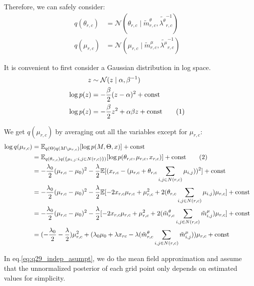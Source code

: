 \documentclass[12pt]{article}
\newcommand\numberthis{\addtocounter{equation}{1}\tag{\theequation}}
\newenvironment{problem}[2][Problem]{\begin{trivlist}
\item[\hskip \labelsep {\bfseries #1}\hskip \labelsep {\bfseries #2.}]}{\end{trivlist}}
\begin{document}
\begin{problem}{2.9.25}
Therefore, we can safely consider:
\begin{align*}
    q(\theta_{r,c}) &= \mathcal{N}(\theta_{r,c} 
                \mid \tilde{m}^{\theta}_{r,c}, \tilde{\lambda^{\theta}}^{-1}_{r,c}) \\
    q(\mu_{r,c}) &= \mathcal{N}(\mu_{r,c} 
                \mid \tilde{m}^{\mu}_{r,c}, \tilde{\lambda^{\mu}}^{-1}_{r,c})
\end{align*}

It is convenient to first consider a Gaussian distribution in log space.
\begin{align*}
    z &\sim \mathcal{N}(z\mid \alpha, \beta^{-1}) \\
    \log p(z) &= -\frac{\beta}{2}(z - \alpha)^2 +\text{const} \\
    \log p(z) &= -\frac{\beta}{2}z^2 + \alpha\beta z + \text{const} \numberthis \label{eq:logspaceNormal}
\end{align*}

We get $q(\mu_{r,c})$ by averaging out all the variables except for $\mu_{r,c}$:
\begin{align*}
    \log q(\mu_{r,c}) &= 
        \mathbb{E}_{q(\Theta)q(M\backslash\mu_{r,c})}[\log p(M, \Theta, x)] 
        + \text{const} \\
    &= \mathbb{E}_{q(\theta_{r,c})q(\{\mu_{i,j}: i, j \in N(r,c)\})}[\log p(\theta_{r,c}, \mu_{r,c}, x_{r,c})]
    + \text{const} \numberthis \label{eq:q29_indep_asumpt} \\
    &= -\frac{\lambda_0}{2}(\mu_{r,c} - \mu_0)^2
    -\frac{\lambda}{2}\mathbb{E}[(x_{r,c} - (\mu_{r,c} + \theta_{r,c}\sum_{i,j \in N(r,c)}\mu_{i,j}))^2] + \text{const} \\
    &= -\frac{\lambda_0}{2}(\mu_{r,c} - \mu_0)^2 
    -\frac{\lambda}{2}\mathbb{E}[-2x_{r,c}\mu_{r,c} + \mu_{r,c}^2 + 2(\theta_{r,c}\sum_{i,j \in N(r,c)}\mu_{i,j})\mu_{r,c}]
    + \text{const} \\
    &= -\frac{\lambda_0}{2}(\mu_{r,c} - \mu_0)^2 
    -\frac{\lambda}{2}[-2x_{r,c}\mu_{r,c} + \mu_{r,c}^2 + 2(\tilde{m}^{\theta}_{r,c}\sum_{i,j \in N(r,c)}\tilde{m}^{\mu}_{i,j})\mu_{r,c}]
    + \text{const} \\
    &= (-\frac{\lambda_0}{2} -\frac{\lambda}{2})\mu_{r,c}^2
    + (\lambda_0\mu_0 + \lambda x_{rc} -\lambda(\tilde{m}^{\theta}_{r,c}\sum_{i,j \in N(r,c)}\tilde{m}^{\mu}_{i,j}))\mu_{r,c}
    + \text{const} \\
\end{align*}

In eq.\eqref{eq:q29_indep_asumpt}, we do the mean field approximation and 
assume that the unnormalized posterior of each grid point only depends on
estimated values for simplicity. 


\end{problem}
\end{document}
